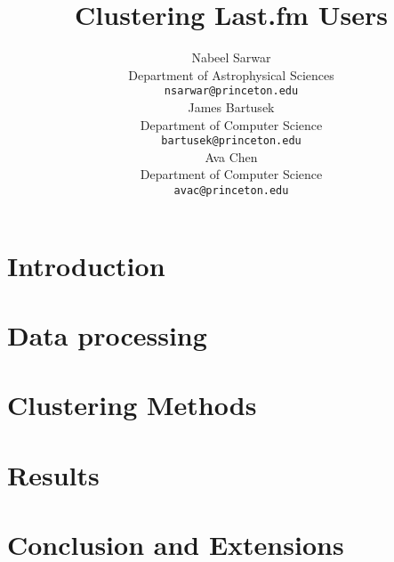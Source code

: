 \documentclass{article} %
\title{Clustering Last.fm Users}
\author{
Nabeel Sarwar\\
Department of Astrophysical Sciences\\
\texttt{nsarwar@princeton.edu} \\
\And
James Bartusek\\
Department of Computer Science\\
\texttt{bartusek@princeton.edu} \\
\And
Ava Chen\\
Department of Computer Science\\
\texttt{avac@princeton.edu}\\
}
\begin{document}
\maketitle

\begin{abstract}
\end{abstract}
\section{Introduction}



\section{Data processing}





\section{Clustering Methods}


\section{Results}

\section{Conclusion and Extensions}



\end{document}
